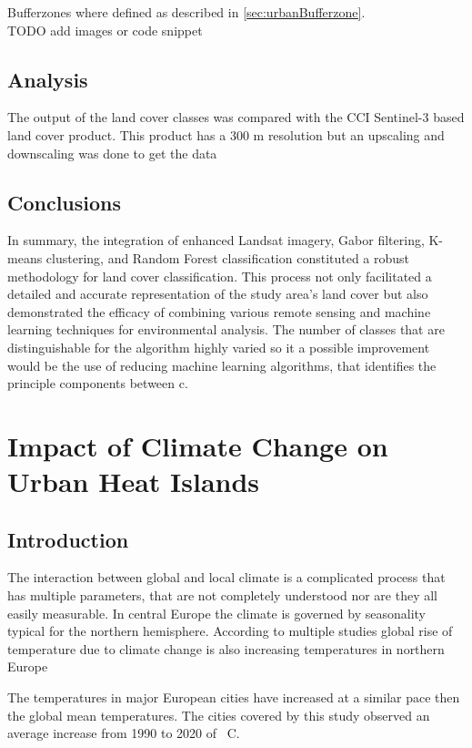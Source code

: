 \documentclass[12pt,a4paper, english]{article}
\begin{document}
      Bufferzones where defined as described in \cref{sec:urbanBufferzone}.\\
      TODO add images or code snippet
 \subsection{Analysis}\label{sec:landcoverAnalysis} 
  The output of the land cover classes was compared with the CCI Sentinel-3 based land cover product. This product has a 300 m resolution but an upscaling and downscaling was done to get the data

 \subsection{Conclusions}
    In summary, the integration of enhanced Landsat imagery, Gabor filtering, K-means clustering, and Random Forest classification constituted a robust methodology for land cover classification.
    This process not only facilitated a detailed and accurate representation of the study area's land cover but also demonstrated the efficacy of combining various remote sensing and machine learning techniques for environmental analysis.
    The number of classes that are distinguishable for the algorithm highly varied so it a possible improvement would be the use of reducing machine learning algorithms, that identifies the principle components between c.
  \newpage
  \section{Impact of Climate Change on Urban Heat Islands}\label{sec:UHITempImp}
    \subsection{Introduction}
       The interaction between global and local climate is a complicated process that has multiple parameters, that are not completely understood nor are they all easily measurable. 
       In central Europe the climate is governed by seasonality typical for the northern hemisphere.  
       According to multiple studies global rise of temperature due to climate change is also increasing temperatures in northern Europe~\autocite{Benestad2005}  %

       The temperatures in major European cities have increased at a similar pace then the global mean temperatures. 
       The cities covered by this study observed an average increase from 1990 to 2020 of %
       \textdegree\ C. 
   
\end{document}
